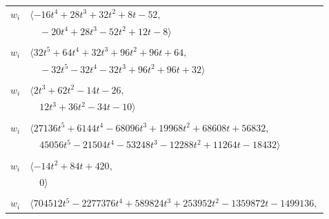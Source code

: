 \documentclass[11pt]{article}
\begin{document}
\begin{longtable}{@{}ll@{}}
$w_i$ & $\langle -16t^{4}+28t^{3}+32t^{2}+8t-52,$\\
 & $\quad -20t^{4}+28t^{3}-52t^{2}+12t-8\rangle$\\
\addlinespace[2pt]
\multicolumn{2}{@{}p{0.97\textwidth}@{}}{$i=57$, $D_i=16$, $\rho_{ij}$: $3{:}2, \allowbreak 13{:}2, \allowbreak 22{:}1, \allowbreak 26{:}2, \allowbreak 45{:}1, \allowbreak 46{:}1, \allowbreak 55{:}1$}\\
$w_i$ & $\langle 32t^{5}+64t^{4}+32t^{3}+96t^{2}+96t+64,$\\
 & $\quad -32t^{5}-32t^{4}-32t^{3}+96t^{2}+96t+32\rangle$\\
\addlinespace[2pt]
\multicolumn{2}{@{}p{0.97\textwidth}@{}}{$i=58$, $D_i=1$, $\rho_{ij}$: $5{:}1, \allowbreak 7{:}1, \allowbreak 34{:}1, \allowbreak 45{:}1, \allowbreak 49{:}1, \allowbreak 53{:}2, \allowbreak 62{:}2, \allowbreak 63{:}2$}\\
$w_i$ & $\langle 2t^{3}+62t^{2}-14t-26,$\\
 & $\quad 12t^{3}+36t^{2}-34t-10\rangle$\\
\addlinespace[2pt]
\multicolumn{2}{@{}p{0.97\textwidth}@{}}{$i=59$, $D_i=512$, $\rho_{ij}$: $0{:}2, \allowbreak 1{:}2, \allowbreak 9{:}2, \allowbreak 11{:}2, \allowbreak 20{:}2, \allowbreak 22{:}1, \allowbreak 24{:}1, \allowbreak 26{:}1, \allowbreak 29{:}1, \allowbreak 30{:}2, \allowbreak 35{:}1, \allowbreak 56{:}1$}\\
$w_i$ & $\langle 27136t^{5}+6144t^{4}-68096t^{3}+19968t^{2}+68608t+56832,$\\
 & $\quad 45056t^{5}-21504t^{4}-53248t^{3}-12288t^{2}+11264t-18432\rangle$\\
\addlinespace[2pt]
\multicolumn{2}{@{}p{0.97\textwidth}@{}}{$i=60$, $D_i=2$, $\rho_{ij}$: $17{:}2, \allowbreak 19{:}2, \allowbreak 21{:}1, \allowbreak 27{:}2, \allowbreak 31{:}2, \allowbreak 32{:}2$}\\
$w_i$ & $\langle -14t^{2}+84t+420,$\\
 & $\quad 0\rangle$\\
\addlinespace[2pt]
\multicolumn{2}{@{}p{0.97\textwidth}@{}}{$i=61$, $D_i=8192$, $\rho_{ij}$: $0{:}1, \allowbreak 3{:}2, \allowbreak 16{:}2, \allowbreak 18{:}1, \allowbreak 23{:}1, \allowbreak 24{:}1, \allowbreak 26{:}1, \allowbreak 28{:}1, \allowbreak 30{:}2, \allowbreak 37{:}1, \allowbreak 38{:}2, \allowbreak 47{:}2, \allowbreak 49{:}1, \allowbreak 63{:}1, \allowbreak 65{:}1$}\\
$w_i$ & $\langle 704512t^{5}-2277376t^{4}+589824t^{3}+253952t^{2}-1359872t-1499136,$\\

\end{longtable}
\end{document}
